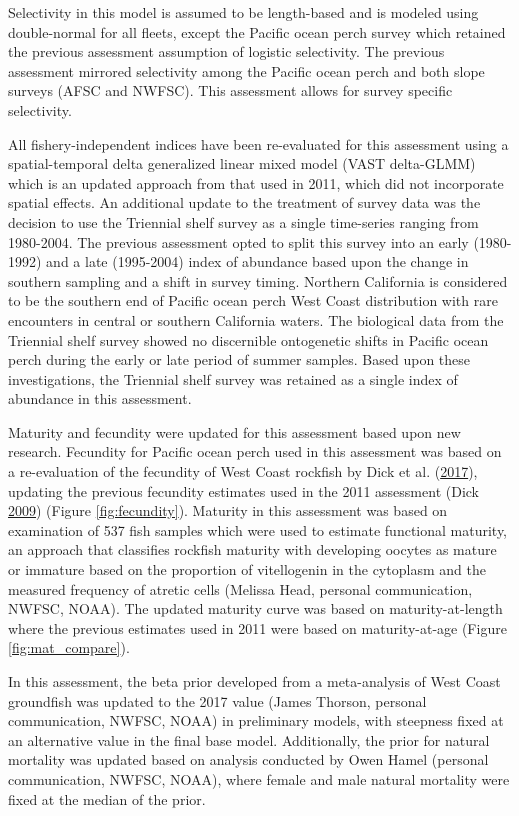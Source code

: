 \documentclass[12pt,]{article}
\begin{document}
Selectivity in this model is assumed to be length-based and is modeled
using double-normal for all fleets, except the Pacific ocean perch
survey which retained the previous assessment assumption of logistic
selectivity. The previous assessment mirrored selectivity among the
Pacific ocean perch and both slope surveys (AFSC and NWFSC). This
assessment allows for survey specific selectivity.

All fishery-independent indices have been re-evaluated for this
assessment using a spatial-temporal delta generalized linear mixed model
(VAST delta-GLMM) which is an updated approach from that used in 2011,
which did not incorporate spatial effects. An additional update to the
treatment of survey data was the decision to use the Triennial shelf
survey as a single time-series ranging from 1980-2004. The previous
assessment opted to split this survey into an early (1980-1992) and a
late (1995-2004) index of abundance based upon the change in southern
sampling and a shift in survey timing. Northern California is considered
to be the southern end of Pacific ocean perch West Coast distribution
with rare encounters in central or southern California waters. The
biological data from the Triennial shelf survey showed no discernible
ontogenetic shifts in Pacific ocean perch during the early or late
period of summer samples. Based upon these investigations, the Triennial
shelf survey was retained as a single index of abundance in this
assessment.

Maturity and fecundity were updated for this assessment based upon new
research. Fecundity for Pacific ocean perch used in this assessment was
based on a re-evaluation of the fecundity of West Coast rockfish by Dick
et al. (\protect\hyperlink{ref-dick_meta-analysis_2017}{2017}), updating
the previous fecundity estimates used in the 2011 assessment (Dick
\protect\hyperlink{ref-dick_modeling_2009}{2009}) (Figure
\ref{fig:fecundity}). Maturity in this assessment was based on
examination of 537 fish samples which were used to estimate functional
maturity, an approach that classifies rockfish maturity with developing
oocytes as mature or immature based on the proportion of vitellogenin in
the cytoplasm and the measured frequency of atretic cells (Melissa Head,
personal communication, NWFSC, NOAA). The updated maturity curve was
based on maturity-at-length where the previous estimates used in 2011
were based on maturity-at-age (Figure \ref{fig:mat_compare}).

In this assessment, the beta prior developed from a meta-analysis of
West Coast groundfish was updated to the 2017 value (James Thorson,
personal communication, NWFSC, NOAA) in preliminary models, with
steepness fixed at an alternative value in the final base model.
Additionally, the prior for natural mortality was updated based on
analysis conducted by Owen Hamel (personal communication, NWFSC, NOAA),
where female and male natural mortality were fixed at the median of the
prior.
\end{document}
